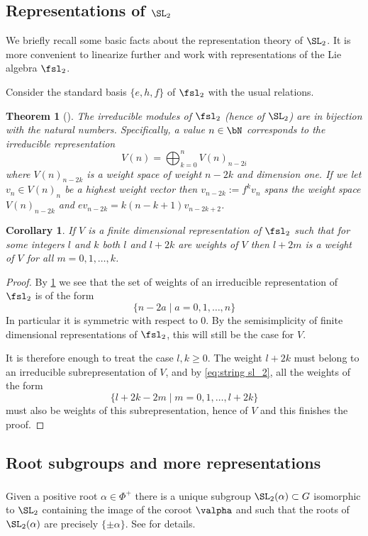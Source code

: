 \documentclass[reqno, 10pt]{amsart}
\theoremstyle{plain}
\newtheorem{theorem}[proposition]{Theorem}
\newtheorem{corollary}[proposition]{Corollary}
\theoremstyle{definition}
\numberwithin{equation}{section}%
\begin{document}
\subsection{Representations of $\SL_2$}
We briefly recall some basic facts about the representation theory of $\SL_2$.
It is more convenient to linearize further and work with representations of the Lie algebra $\fsl_2$.


Consider the standard basis $\{e,h,f\}$ of $\fsl_2$ with the usual relations.
\begin{theorem}[{\cite[Theorem7.2]{humphreys2012introduction}}]\label{T:sl_2 reps}
	The irreducible modules of $\fsl_2$ (hence of $\SL_2$) are in bijection with the natural numbers.
	Specifically, a value $n\in \bN$ corresponds to the irreducible representation
	\[ V(n) =\bigoplus_{k=0}^n V(n)_{n-2i}\]
	where $V(n)_{n-2k}$ is a weight space of weight $n-2k$ and dimension one. If we let $v_n\in V(n)_n$ be a highest weight vector then $v_{n-2k}:=f^kv_n$ spans the weight space $V(n)_{n-2k}$ and
	$ev_{n-2k} =k(n-k+1)v_{n-2k+2}$.
\end{theorem}
\begin{corollary}\label{c:strings sl_2 reps}
	If $V$ is a finite dimensional representation of $\fsl_2$ such that for some integers $l$ and $k$ both $l$ and $l+2k$ are weights of $V$ then $l+2m$ is a weight of $V$ for all $m=0,1,\dots,k$.
\end{corollary}
\begin{proof}
	By \cref{T:sl_2 reps} we see that the set of weights of an irreducible representation of $\fsl_2$ is of the form
	\begin{equation}\label{eq:string sl_2}
	\{n-2a\mid a=0,1,\dots,n\} 
	\end{equation} 
	In particular it is symmetric with respect to $0$.
	By the semisimplicity of finite dimensional representations of $\fsl_2$, this will still be the case for $V$.
	
	It is therefore enough to treat the case $l,k\ge 0$.
	The weight $l+2k$ must belong to an irreducible subrepresentation of $V$, and by \eqref{eq:string sl_2}, all the weights of the form
	\[\{l+2k-2m\mid m=0,1,\dots,l+2k\}\]
	must also be weights of this subrepresentation, hence of $V$ and this finishes the proof.	
\end{proof}
\subsection{Root subgroups and more representations}
\subsubsection{} Given a positive root $\alpha\in\Phi^+$ there is a unique subgroup $\SL_2(\alpha)\subset G$ isomorphic to $\SL_2$ containing the image of the coroot $\valpha$ and such that the roots of $\SL_2(\alpha)$ are precisely $\{\pm\alpha\}$. See \cite[Theorem 13.18]{borel2012linear} for details.
\end{document}
